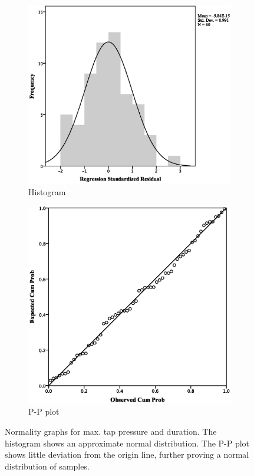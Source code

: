 \begin{figure}[ht]
\centering
\begin{subfigure}[b]{0.45\textwidth}
    \centering
    \includegraphics[width=\textwidth]{images/secondary/max/MaxHistogram.eps}
    \caption{Histogram}
    \label{fig:sec_max_hist}
\end{subfigure}
\quad
\begin{subfigure}[b]{0.45\textwidth}
    \centering
    \includegraphics[width=\textwidth]{images/secondary/max/MaxP-P.eps}
    \caption{P-P plot}
    \label{fig:sec_max_PP}
\end{subfigure}
\caption{Normality graphs for max. tap pressure and duration. The histogram shows an approximate normal distribution. The P-P plot shows little deviation from the origin line, further proving a normal distribution of samples.}
\end{figure}
